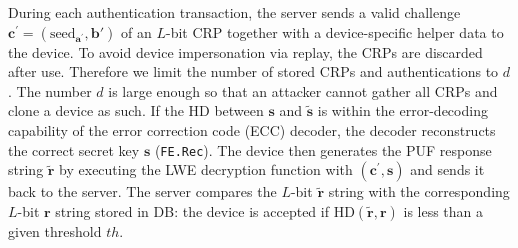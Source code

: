 During each authentication transaction, the server sends a valid challenge $\mathbf{c}^\prime=(\text{seed}_{\mathbf{a}^\prime}, \mathbf{b}')$ of an $L$-bit CRP together with a device-specific helper data to the device. 
To avoid device impersonation via replay, the CRPs are discarded after use. Therefore we limit the number of stored CRPs and authentications to $d$. The number $d$ is large enough so that an attacker cannot gather all CRPs and clone a device as such.
If the HD between $\mathbf{s}$ and $\tilde{\mathbf{s}}$ is within the error-decoding capability of the error correction code (ECC) decoder, the decoder reconstructs the correct secret key $\mathbf{s}$ (\texttt{FE.Rec}). 
The device then generates the PUF response string $\tilde{\mathbf{r}}$ by executing the LWE decryption function with $(\mathbf{c}^\prime, \mathbf{s})$ and sends it back to the server. 
The server compares the $L$-bit $\tilde{\mathbf{r}}$ string with the corresponding $L$-bit $\mathbf{r}$ string stored in DB:
the device is accepted if $\text{HD}(\tilde{\mathbf{r}}, \mathbf{r})$ is less than a given threshold $th$.
